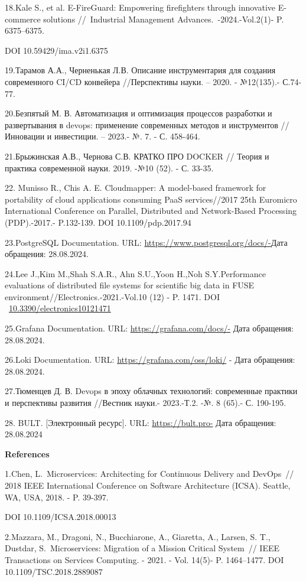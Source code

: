 \documentclass[
]{article}
\begin{document}
18.Kale S., et al. E-FireGuard: Empowering firefighters through
innovative E-commerce solutions //~Industrial Management
Advances.~-2024.-Vol.2(1)- P. 6375--6375.

DOI 10.59429/ima.v2i1.6375

19.Тарамов А.А., Черненькая Л.В. Описание инструментария для создания
современного CI/CD конвейера //Перспективы науки. -- 2020. - №12(135).-
С.74-77.

20.Безпятый М. В. Автоматизация и оптимизация процессов разработки и
развертывания в devops: применение современных методов и инструментов
//Инновации и инвестиции. -- 2023.- №. 7. - С. 458-464.

21.Брыжинская А.В., Чернова С.В. КРАТКО ПРО DOCKER // Теория и практика
современной науки. 2019. -№10 (52). - С. 33-35.

22. Munisso R., Chis A. E. Cloudmapper: A model-based framework for
portability of cloud applications consuming PaaS services//2017 25th
Euromicro International Conference on Parallel, Distributed and
Network-Based Processing (PDP).-2017.- P.132-139. DOI
10.1109/pdp.2017.94

23.PostgreSQL Documentation. URL:
\url{https://www.postgresql.org/docs/-}Дата обращения: 28.08.2024.

24.Lee J.,Kim M.,Shah S.A.R., Ahn S.U.,Yoon H.,Noh S.Y.Performance
evaluations of distributed file systems for scientific big data in FUSE
environment//Electronics.-2021.-Vol.10 (12) - P. 1471. DOI
~\href{https://doi.org/10.3390/electronics10121471}{10.3390/electronics10121471}

25.Grafana Documentation. URL: \url{https://grafana.com/docs/-} Дата
обращения: 28.08.2024.

26.Loki Documentation. URL: \url{https://grafana.com/oss/loki/} - Дата
обращения: 28.08.2024.

27.Тюменцев Д. В. Devops в эпоху облачных технологий: современные
практики и перспективы развития //Вестник науки.- 2023.-Т.2. -№. 8
(65).- С. 190-195.

28. BULT. {[}Электронный ресурс{]}. URL: \url{https://bult.pro-} Дата
обращения: 28.08.2024

\textbf{References}

1.Chen, L.~Microservices: Architecting for Continuous Delivery and
DevOps~// 2018 IEEE International Conference on Software Architecture
(ICSA). Seattle, WA, USA, 2018. - P. 39-397.

DOI 10.1109/ICSA.2018.00013

2.Mazzara, M., Dragoni, N., Bucchiarone, A., Giaretta, A., Larsen, S.
T., Dustdar, S.~Microservices: Migration of a Mission Critical System~//
IEEE Transactions on Services Computing. - 2021. - Vol. 14(5)- P.
1464--1477. DOI 10.1109/TSC.2018.2889087
\end{document}
